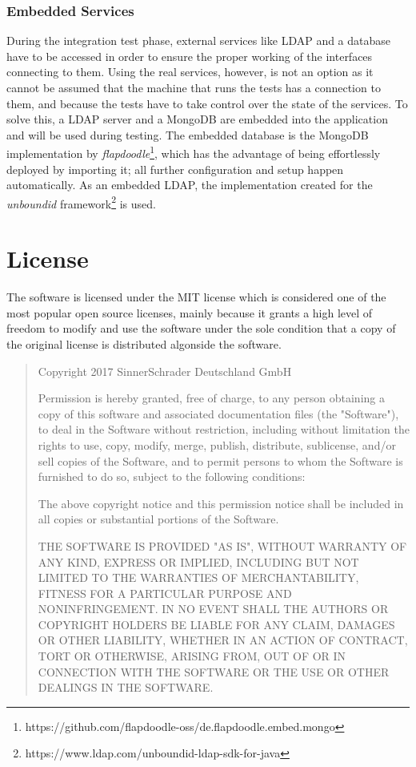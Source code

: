 \subsubsection{Embedded Services}
During the integration test phase, external services like LDAP and a database have to be accessed in order to ensure the proper working of the interfaces connecting to them. Using the real services, however, is not an option as it cannot be assumed that the machine that runs the tests has a connection to them, and because the tests have to take control over the state of the services. To solve this, a LDAP server and a MongoDB are embedded into the application and will be used during testing.
The embedded database is the MongoDB implementation by \textit{flapdoodle}\footnote{https://github.com/flapdoodle-oss/de.flapdoodle.embed.mongo}, which has the advantage of being effortlessly deployed by importing it; all further configuration and setup happen automatically. As an embedded LDAP, the implementation created for the \textit{unboundid} framework\footnote{https://www.ldap.com/unboundid-ldap-sdk-for-java} is used.

\section{License}
The software is licensed under the MIT license \cite{license} which is considered one of the most popular open source licenses, mainly because it grants a high level of freedom to modify and use the software under the sole condition that a copy of the original license is distributed algonside the software.

\begin{quote}
Copyright 2017 SinnerSchrader Deutschland GmbH

Permission is hereby granted, free of charge, to any person obtaining a copy of this software and associated documentation files (the "Software"), to deal in the Software without restriction, including without limitation the rights to use, copy, modify, merge, publish, distribute, sublicense, and/or sell copies of the Software, and to permit persons to whom the Software is furnished to do so, subject to the following conditions:

The above copyright notice and this permission notice shall be included in all copies or substantial portions of the Software.

THE SOFTWARE IS PROVIDED "AS IS", WITHOUT WARRANTY OF ANY KIND, EXPRESS OR IMPLIED, INCLUDING BUT NOT LIMITED TO THE WARRANTIES OF MERCHANTABILITY, FITNESS FOR A PARTICULAR PURPOSE AND NONINFRINGEMENT. IN NO EVENT SHALL THE AUTHORS OR COPYRIGHT HOLDERS BE LIABLE FOR ANY CLAIM, DAMAGES OR OTHER LIABILITY, WHETHER IN AN ACTION OF CONTRACT, TORT OR OTHERWISE, ARISING FROM, OUT OF OR IN CONNECTION WITH THE SOFTWARE OR THE USE OR OTHER DEALINGS IN THE SOFTWARE.
\end{quote}\cite{license}
